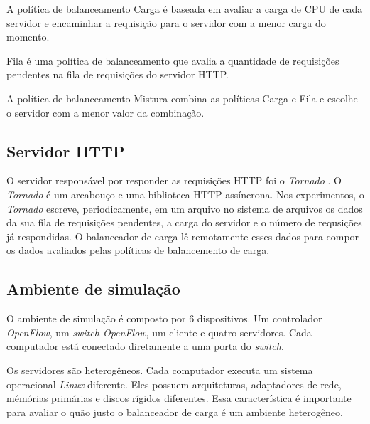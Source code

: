 A política de balanceamento Carga é baseada em avaliar a carga de CPU 
de cada servidor e encaminhar a requisição para o servidor com a menor 
carga do momento.
    
Fila é uma política de balanceamento que avalia a quantidade de requisições
pendentes na fila de requisições do servidor HTTP.
    
A política de balanceamento Mistura combina as políticas Carga e Fila 
e escolhe o servidor com a menor valor da combinação.

\subsection{Servidor HTTP}

O servidor responsável por responder as requisições HTTP foi o 
\emph{Tornado} \citep{tornado}.
O \emph{Tornado} é um arcabouço e uma biblioteca HTTP assíncrona.
Nos experimentos, o \emph{Tornado} escreve, periodicamente, em um arquivo 
no sistema de arquivos os dados da sua fila de requisições pendentes,
a carga do servidor e o número de requsições já respondidas.
O balanceador de carga lê remotamente esses dados para compor os 
dados avaliados pelas políticas de balancemento de carga.

\subsection{Ambiente de simulação}

O ambiente de simulação é composto por 6 dispositivos.
Um controlador \emph{OpenFlow}, um \emph{switch OpenFlow}, um 
cliente e quatro servidores.
Cada computador está conectado diretamente a uma porta do \emph{switch}.

Os servidores são heterogêneos.
Cada computador executa um sistema operacional \emph{Linux} diferente.
Eles possuem arquiteturas, adaptadores de rede, mémórias primárias
e discos rígidos diferentes.
Essa característica é importante para avaliar o quão justo o balanceador 
de carga é um ambiente heterogêneo.
